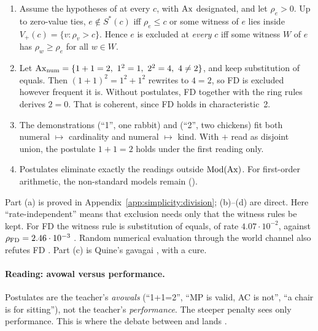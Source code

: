 \begin{proposition}\label{prop:simplicity:postulates}
\leavevmode
\begin{enumerate}[label=(\alph*)]
\item Assume the hypotheses of  at every $c$, with $\mathrm{Ax}$ designated, and let $\rho_e>0$. Up to zero-value ties, $e\notin S^*(c)$ iff $\rho_e\le c$ or some witness of $e$ lies inside $V_+(c)=\{v:\rho_v>c\}$. Hence $e$ is excluded at \emph{every} $c$ iff some witness $W$ of $e$ has $\rho_w\ge\rho_e$ for all $w\in W$.
\item Let $\Ax_{\rm num}=\{1+1=2,\ 1^2=1,\ 2^2=4,\ 4\neq2\}$, and keep substitution of equals. Then $(1+1)^2=1^2+1^2$ rewrites to $4=2$, so FD is excluded however frequent it is. Without postulates, FD together with the ring rules derives $2=0$. That is coherent, since FD holds in characteristic~2.
\item The demonstrations (``1'', one rabbit) and (``2'', two chickens) fit both numeral $\mapsto$ cardinality and numeral $\mapsto$ kind. With $+$ read as disjoint union, the postulate $1+1=2$ holds under the first reading only.
\item Postulates eliminate exactly the readings outside $\mathrm{Mod}(\mathrm{Ax})$. For first-order arithmetic, the non-standard models remain ().
\end{enumerate}
\end{proposition}

Part (a) is proved in Appendix~\ref{app:simplicity:division}; (b)--(d) are direct. Here ``rate-independent'' means that exclusion needs only that the witness rules be kept. For FD the witness rule is substitution of equals, of rate $4.07\cdot10^{-2}$, against $\rho_{\rm FD}=2.46\cdot10^{-3}$ . Random numerical evaluation through the world channel also refutes FD \citep{schwartz1980fast,zippel1979probabilistic}. Part (c) is Quine's gavagai \citep{quine1960word}, with a cure.

\paragraph{Reading: avowal versus performance.} Postulates are the teacher's \emph{avowals} (``1+1=2'', ``MP is valid, AC is not'', ``a chair is for sitting''), not the teacher's \emph{performance}. The steeper penalty sees only performance. This is where the debate between \citet{stich1980justification} and \citet{cohen1981can} lands .

